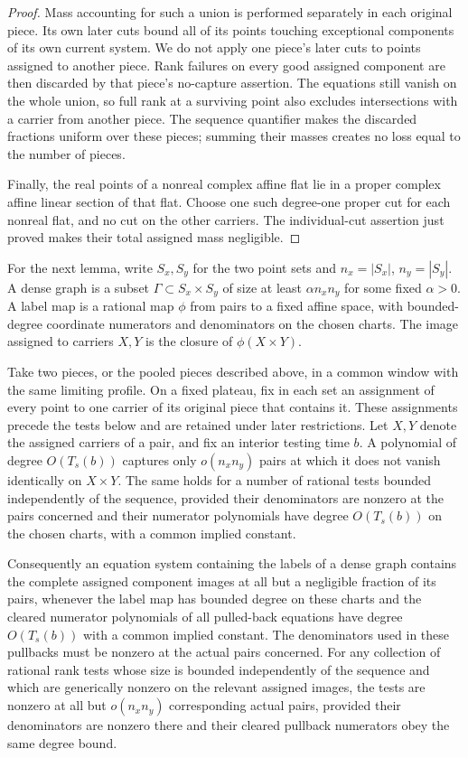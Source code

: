 \begin{proof}
Mass accounting for such a union is performed separately in each
original piece.  Its own later cuts bound all of its points
touching exceptional components of its own current system.  We
do not apply one piece's later cuts to points assigned to another
piece.  Rank failures on every good assigned component are then
discarded by that piece's no-capture assertion.  The equations
still vanish on the whole union, so full rank at a surviving point
also excludes intersections with a carrier from another piece.
The sequence quantifier makes the discarded fractions uniform
over these pieces; summing their masses creates no loss equal to
the number of pieces.

Finally, the real points of a nonreal complex affine flat lie in
a proper complex affine linear section of that flat.  Choose
one such degree-one proper cut for each nonreal flat, and no
cut on the other carriers.  The individual-cut assertion just
proved makes their total assigned mass negligible.
\end{proof}

For the next lemma, write $S_x,S_y$ for the two point sets and
$n_x=|S_x|$, $n_y=|S_y|$.  A dense graph is a subset
$\Gamma\subset S_x\times S_y$ of size at least $\alpha n_xn_y$
for some fixed $\alpha>0$.  A label map is a rational map $\phi$
from pairs to a fixed affine space, with bounded-degree coordinate
numerators and denominators on the chosen charts.  The image assigned
to carriers $X,Y$ is the closure of $\phi(X\times Y)$.

\begin{lemma}\label{prof:product-testing}
Take two pieces, or the pooled pieces described above, in a common
window with the same limiting profile. On a fixed plateau, fix in
each set an assignment of every point to one carrier of its original
piece that contains it. These assignments precede the tests below
and are retained under later restrictions. Let $X,Y$ denote the
assigned carriers of a pair, and fix an interior testing time $b$.
A polynomial of degree $O(T_s(b))$ captures only
$o(n_xn_y)$ pairs at which it does not vanish identically on
$X\times Y$. The same holds for a number of rational tests bounded
independently of the sequence, provided their denominators are
nonzero at the pairs concerned and their numerator polynomials have
degree $O(T_s(b))$ on the chosen charts, with a common implied
constant.

Consequently an equation system containing the labels of a dense
graph contains the complete assigned component images at all but
a negligible fraction of its pairs, whenever the label map has
bounded degree on these charts and the cleared numerator polynomials
of all pulled-back equations have degree $O(T_s(b))$ with a common
implied constant. The denominators used in these pullbacks must be
nonzero at the actual pairs concerned. For any collection of rational
rank tests whose size is bounded independently of the sequence and
which are generically nonzero on the relevant assigned images, the
tests are nonzero at all but $o(n_xn_y)$ corresponding actual pairs,
provided their denominators are nonzero there and their cleared
pullback numerators obey the same degree bound.
\end{lemma}

